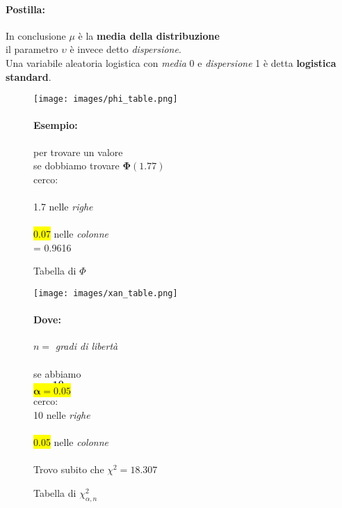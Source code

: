 \documentclass[]{article}
\begin{document}
    \paragraph{Postilla:} In conclusione $\mu$ è la \textbf{media della distribuzione}\\ 
    il parametro $\upsilon$ è invece detto \textit{dispersione}. \\ 
    Una variabile aleatoria logistica con \textit{media} 0 e \textit{dispersione} 1 è detta
    \textbf{logistica standard}.
    \newpage
    \begin{figure}[H]
        \caption{Tabella di $\Phi$}
        \begin{minipage}{0.59\textwidth}
            \texttt{[image: images/phi\_table.png]}
        \end{minipage}
        \begin{minipage}{0.4\textwidth}
            \paragraph{Esempio:} per trovare un valore \\
            se dobbiamo trovare $\boldsymbol{\Phi(1.77)}$ \\
            cerco: \\ \\
            \colorbox{bittersweet}{1.7} nelle \textit{righe} \\ \\
            \colorbox{yellow}{0.07} nelle \textit{colonne} \\
            = 0.9616
        \end{minipage}
    \end{figure}
    \begin{figure}[H]
        \caption{Tabella di $\chi_{\alpha, n}^2$}
        \begin{minipage}{0.59\textwidth}
            \texttt{[image: images/xan\_table.png]}
        \end{minipage}
        \begin{minipage}{0.4\textwidth}
            \paragraph{Dove:}
            $n = $ \textit{gradi di libertà} \\ \\
            se abbiamo \\
            \colorbox{bittersweet}{$\boldsymbol{n = 10}$} \\
            \colorbox{yellow}{$\boldsymbol{\alpha = 0.05}$} \\
            cerco: \\
            \colorbox{bittersweet}{10} nelle \textit{righe} \\ \\
            \colorbox{yellow}{0.05} nelle \textit{colonne} \\ \\
            Trovo subito che $\chi^2 = 18.307$
        \end{minipage}
    \end{figure}
\end{document}
